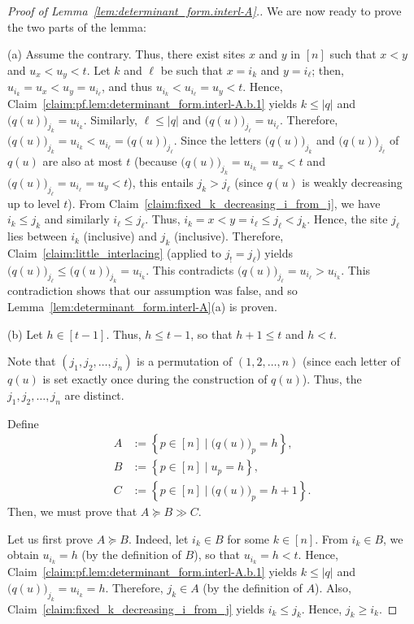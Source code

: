 \documentclass[reqno]{amsart}
\newcommand{\0}{\phantom{c}}
\newcommand{\set}[1]{\left\{ #1 \right\}}
\newcommand{\abs}[1]{\left| #1 \right|}
\newcommand{\tup}[1]{\left( #1 \right)}
\newcommand{\ive}[1]{\left[ #1 \right]}
\theoremstyle{plain}
\theoremstyle{definition}
\numberwithin{equation}{section}
\begin{document}
\begin{proof}[Proof of Lemma~\ref{lem:determinant_form.interl-A}.]
We are now ready to prove the two parts of the lemma:

(a) Assume the contrary.
Thus, there exist sites $x$ and $y$ in $\ive{n}$ such that $x<y$ and $u_{x} < u_{y} < t$.
Let $k$ and $\ell $ be such that $x = i_k$ and $y = i_{\ell}$; then, $u_{i_k} = u_{x} < u_{y} = u_{i_{\ell}}$, and thus $u_{i_k} < u_{i_{\ell}} = u_{y} < t$.
Hence, Claim~\ref{claim:pf.lem:determinant_form.interl-A.b.1} yields $k \leq \abs{q}$ and $\bigl( q(u) \bigr)_{j_k} = u_{i_k}$.
Similarly, $\ell \leq \abs{q}$ and
$\bigl( q(u) \bigr)_{j_{\ell}} = u_{i_{\ell}}$.
Therefore, $\bigl( q(u) \bigr)_{j_k} = u_{i_k} < u_{i_{\ell}} = \bigl( q(u) \bigr)_{j_{\ell}}$.
Since the letters $\bigl( q(u) \bigr) _{j_k}$ and $\bigl( q(u) \bigr)_{j_{\ell}}$ of $q(u)$ are also at most $t$ (because $\bigl( q(u) \bigr)_{j_k} = u_{i_k} = u_{x} < t$ and  $\bigl( q(u) \bigr)_{j_{\ell }} = u_{i_{\ell}} = u_{y} < t$), this entails $j_k > j_{\ell }$ (since $q(u)$ is weakly decreasing up to level $t$).
From Claim~\ref{claim:fixed_k_decreasing_i_from_j}, we have $i_k \leq j_k$ and similarly $i_{\ell} \leq j_{\ell}$.
Thus, $i_k = x < y = i_{\ell} \leq j_{\ell} < j_k$.
Hence, the site $j_{\ell}$ lies between $i_k$ (inclusive) and $j_k$ (inclusive).
Therefore, Claim~\ref{claim:little_interlacing} (applied to $j_{!}=j_{\ell }$) yields $\bigl( q(u) \bigr)_{j_{\ell}} \leq \bigl( q(u) \bigr)_{j_k} = u_{i_k}$.
This contradicts $\bigl( q(u) \bigr)_{j_{\ell}} = u_{i_{\ell }} > u_{i_k}$.
This contradiction shows that our assumption was false, and so Lemma~\ref{lem:determinant_form.interl-A}(a) is proven.

(b) Let $h \in \ive{t-1}$.
Thus, $h \leq t-1$, so that $h + 1 \leq t$ and $h < t$.

Note that $\tup{ j_1, j_2, \dotsc, j_n}$ is a permutation of $\tup{1, 2, \dotsc, n}$ (since each letter of $q(u) $ is set exactly once during the construction of $q(u)$).
Thus, the $j_1, j_2, \dotsc, j_n$ are distinct.

Define
\begin{align*}
A & := \set{ p\in \ive{n} \mid \bigl( q(u) \bigr)_p = h },
\\ B & := \set{ p\in \ive{n} \mid u_p = h },
\\ C & := \set{ p\in \ive{n} \mid \bigl( q(u) \bigr)_p = h+1 }.
\end{align*}
Then, we must prove that $A \succeq B \gg C$.

Let us first prove $A \succeq B$.
Indeed, let $i_k\in B$ for some $k \in \ive{n}$.
From $i_k\in B$, we obtain $u_{i_k} = h$ (by the definition of $B$), so that $u_{i_k} = h < t$.
Hence, Claim~\ref{claim:pf.lem:determinant_form.interl-A.b.1} yields $k\leq \abs{q}$ and $\bigl( q(u) \bigr)_{j_k} = u_{i_k} = h$.
Therefore, $j_k\in A$ (by the definition of $A$).
Also, Claim~\ref{claim:fixed_k_decreasing_i_from_j} yields $i_k\leq j_k$.
Hence, $j_k\geq i_k$.


\end{proof}
\end{document}
